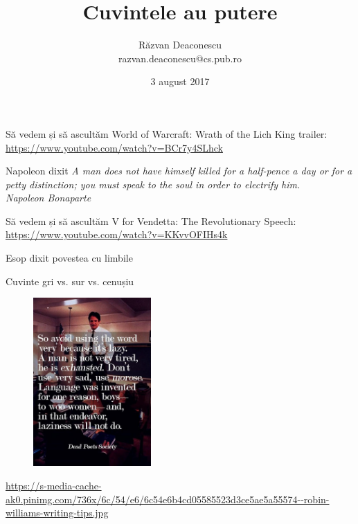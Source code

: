 \documentclass{beamer}
\title[Cuvintele au putere]{Cuvintele au putere}
\institute{InfoEducație 2017 (Gălăciuc, Vrancea)}
\author[Răzvan Deaconescu]{Răzvan Deaconescu \\
razvan.deaconescu@cs.pub.ro}
\date{3 august 2017}
\begin{document}
\frame{\titlepage}

\begin{frame}{Să vedem și să ascultăm}
  \centering
  World of Warcraft: Wrath of the Lich King trailer: \url{https://www.youtube.com/watch?v=BCr7y4SLhck}
\end{frame}

\begin{frame}{Napoleon dixit}
  \centering
  \textit{A man does not have himself killed for a half-pence a day or for a petty distinction; you must speak to the soul in order to electrify him.}\\
  \vspace{3mm}
  \hfill \textit{Napoleon Bonaparte}
\end{frame}

\begin{frame}{Să vedem și să ascultăm}
  \centering
  V for Vendetta: The Revolutionary Speech: \url{https://www.youtube.com/watch?v=KKvvOFIHs4k}
\end{frame}

\begin{frame}{Esop dixit}
  \centering
  povestea cu limbile
\end{frame}

\begin{frame}{Cuvinte}
  \pause
  \centering
  gri vs. sur vs. cenușiu\\
  \pause
  \begin{figure}
    \centering
    \includegraphics[width=0.4\textwidth]{img/dead-poets-society-lazy}
  \end{figure}
  \tiny
  \url{https://s-media-cache-ak0.pinimg.com/736x/6c/54/e6/6c54e6b4cd05585523d3ce5ae5a55574--robin-williams-writing-tips.jpg}
\end{frame}
\end{document}

